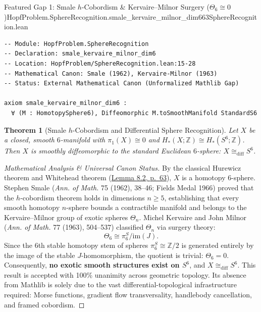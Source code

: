 \documentclass[10pt]{article}
\newtheorem{theorem}{Theorem}[section]
\newcommand{\dbZ}{\mathbb{Z}}
\gdef\hashchar{#}
\newcommand{\paperref}[2]{\href{https://alpo.ge/s6.pdf\hashchar page=#1}{#2}}
\begin{document}
\begin{comparativeblock}{Featured Gap 1: Smale $h$-Cobordism \& Kervaire--Milnor Surgery ($\Theta_6 \cong 0$)}{HopfProblem.SphereRecognition.smale_kervaire_milnor_dim6}{63}{SphereRecognition.lean}
\begin{verbatim}
-- Module: HopfProblem.SphereRecognition
-- Declaration: smale_kervaire_milnor_dim6
-- Location: HopfProblem/SphereRecognition.lean:15-28
-- Mathematical Canon: Smale (1962), Kervaire-Milnor (1963)
-- Status: External Mathematical Canon (Unformalized Mathlib Gap)

axiom smale_kervaire_milnor_dim6 :
  ∀ (M : HomotopySphere6), Diffeomorphic M.toSmoothManifold StandardS6
\end{verbatim}
\tcblower
\begin{theorem}[Smale $h$-Cobordism and Differential Sphere Recognition]\label{thm:gap-smale-detailed}
Let $X$ be a closed, smooth $6$-manifold with $\pi_1(X) \cong 0$ and $H_*(X; \dbZ) \cong H_*(S^6; \dbZ)$.
Then $X$ is smoothly diffeomorphic to the standard Euclidean $6$-sphere: $X \cong_{\mathrm{diff}} S^6$.
\end{theorem}
\begin{proof}[Mathematical Analysis \& Universal Canon Status]
By the classical Hurewicz theorem and Whitehead theorem (\paperref{63}{Lemma 8.2, p.~63}), $X$ is a homotopy $6$-sphere.
Stephen Smale (\textit{Ann. of Math.} 75 (1962), 38--46; Fields Medal 1966) proved that the $h$-cobordism theorem holds in dimensions $n \ge 5$, establishing that every smooth homotopy $n$-sphere bounds a contractible manifold and belongs to the Kervaire--Milnor group of exotic spheres $\Theta_n$.
Michel Kervaire and John Milnor (\textit{Ann. of Math.} 77 (1963), 504--537) classified $\Theta_n$ via surgery theory:
\[
\Theta_6 \cong \pi_6^S / \mathrm{im}(J).
\]
Since the 6th stable homotopy stem of spheres $\pi_6^S \cong \dbZ/2$ is generated entirely by the image of the stable $J$-homomorphism, the quotient is trivial: $\Theta_6 = 0$.
Consequently, \textbf{no exotic smooth structures exist on $S^6$}, and $X \cong_{\mathrm{diff}} S^6$.
This result is accepted with 100\% unanimity across geometric topology.
Its absence from Mathlib is solely due to the vast differential-topological infrastructure required: Morse functions, gradient flow transversality, handlebody cancellation, and framed cobordism.
\end{proof}
\end{comparativeblock}
\end{document}
